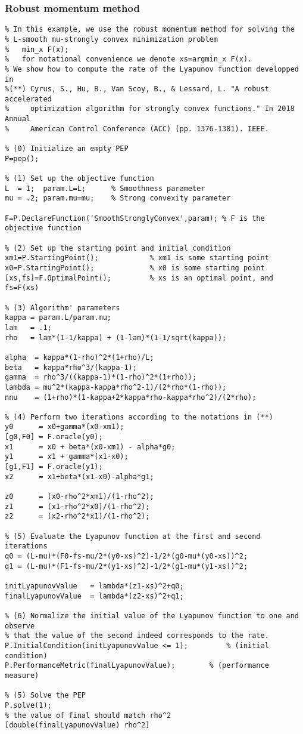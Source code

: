 \documentclass[11pt,a4paper]{article}
\begin{document}
\subsubsection{Robust momentum method}
\begin{lstlisting}
% In this example, we use the robust momentum method for solving the 
% L-smooth mu-strongly convex minimization problem
%   min_x F(x); 
%   for notational convenience we denote xs=argmin_x F(x).
% We show how to compute the rate of the Lyapunov function developped in
%(**) Cyrus, S., Hu, B., Van Scoy, B., & Lessard, L. "A robust accelerated 
%     optimization algorithm for strongly convex functions." In 2018 Annual
%     American Control Conference (ACC) (pp. 1376-1381). IEEE.

% (0) Initialize an empty PEP
P=pep();

% (1) Set up the objective function
L  = 1;  param.L=L;      % Smoothness parameter
mu = .2; param.mu=mu;    % Strong convexity parameter

F=P.DeclareFunction('SmoothStronglyConvex',param); % F is the objective function

% (2) Set up the starting point and initial condition
xm1=P.StartingPoint();            % xm1 is some starting point
x0=P.StartingPoint();             % x0 is some starting point
[xs,fs]=F.OptimalPoint();         % xs is an optimal point, and fs=F(xs)

% (3) Algorithm' parameters
kappa = param.L/param.mu;
lam   = .1;
rho   = lam*(1-1/kappa) + (1-lam)*(1-1/sqrt(kappa));

alpha  = kappa*(1-rho)^2*(1+rho)/L;
beta   = kappa*rho^3/(kappa-1);
gamma  = rho^3/((kappa-1)*(1-rho)^2*(1+rho));
lambda = mu^2*(kappa-kappa*rho^2-1)/(2*rho*(1-rho));
nnu    = (1+rho)*(1-kappa+2*kappa*rho-kappa*rho^2)/(2*rho);

% (4) Perform two iterations according to the notations in (**)
y0      = x0+gamma*(x0-xm1);
[g0,F0] = F.oracle(y0);
x1      = x0 + beta*(x0-xm1) - alpha*g0;
y1      = x1 + gamma*(x1-x0);
[g1,F1] = F.oracle(y1);
x2      = x1+beta*(x1-x0)-alpha*g1;

z0      = (x0-rho^2*xm1)/(1-rho^2);
z1      = (x1-rho^2*x0)/(1-rho^2);
z2      = (x2-rho^2*x1)/(1-rho^2);

% (5) Evaluate the Lyapunov function at the first and second iterations
q0 = (L-mu)*(F0-fs-mu/2*(y0-xs)^2)-1/2*(g0-mu*(y0-xs))^2;
q1 = (L-mu)*(F1-fs-mu/2*(y1-xs)^2)-1/2*(g1-mu*(y1-xs))^2;

initLyapunovValue   = lambda*(z1-xs)^2+q0;
finalLyapunovValue  = lambda*(z2-xs)^2+q1;

% (6) Normalize the initial value of the Lyapunov function to one and observe
% that the value of the second indeed corresponds to the rate.
P.InitialCondition(initLyapunovValue <= 1);     	% (initial condition)
P.PerformanceMetric(finalLyapunovValue);   		% (performance measure)

% (5) Solve the PEP
P.solve(1);
% the value of final should match rho^2
[double(finalLyapunovValue) rho^2]
\end{lstlisting}
\newpage 
\end{document}

